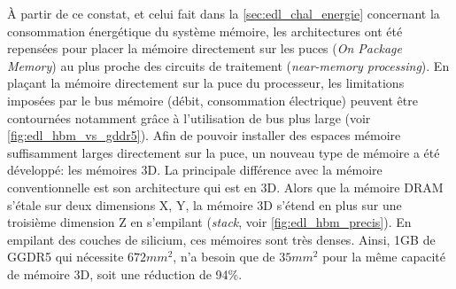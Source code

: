     
        À partir de ce constat, et celui fait dans la \autoref{sec:edl_chal_energie} concernant la consommation énergétique du système mémoire, les architectures ont été repensées pour placer la mémoire directement sur les puces (\textit{On Package Memory}) au plus proche des circuits de traitement (\textit{near-memory processing}). En plaçant la mémoire directement sur la puce du processeur, les limitations imposées par le bus mémoire (débit, consommation électrique) peuvent être contournées notamment grâce à l'utilisation de bus plus large (voir \autoref{fig:edl_hbm_vs_gddr5}). Afin de pouvoir installer des espaces mémoire suffisamment larges directement sur la puce, un nouveau type de mémoire a été développé: les mémoires 3D. La principale différence avec la mémoire conventionnelle est son architecture qui est en 3D. Alors que la mémoire DRAM s’étale sur deux dimensions X, Y, la mémoire 3D s’étend en plus sur une troisième dimension Z en s’empilant (\textit{stack}, voir \autoref{fig:edl_hbm_precis}). En empilant des couches de silicium, ces mémoires sont très denses. Ainsi, 1GB de GGDR5 qui nécessite $672 mm^2$, n'a besoin que de $35 mm^2$ pour la même capacité de mémoire 3D, soit une réduction de 94\%. 
        
                   
        
